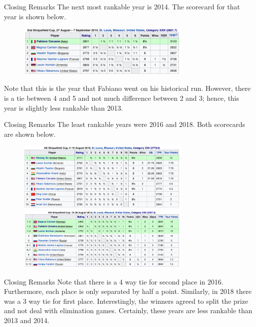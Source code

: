 \documentclass{beamer}
\begin{document}
\begin{frame}{Closing Remarks}
The next most rankable year is 2014.
The scorecard for that year is shown below.
\vfill
\begin{figure}[H]
\centering
\includegraphics[width=0.75\textwidth]{figures/SinquefieldCup2014}
\end{figure}
\vfill
Note that this is the year that Fabiano went on his historical run.
However, there is a tie between 4 and 5 and not much difference between 2 and 3; hence, this year is slightly less rankable than 2013.
\end{frame}

\begin{frame}{Closing Remarks}
The least rankable years were 2016 and 2018. 
Both scorecards are shown below.
\vfill
\begin{figure}[H]
\centering
\includegraphics[width=0.75\textwidth]{figures/SinquefieldCup2016} \\
\includegraphics[width=0.75\textwidth]{figures/SinquefieldCup2018}
\end{figure}
\end{frame}

\begin{frame}{Closing Remarks}
Note that there is a 4 way tie for second place in 2016.
Furthermore, each place is only separated by half a point.
Similarly, in 2018 there was a 3 way tie for first place. 
Interestingly, the winners agreed to split the prize and not deal with elimination games.
Certainly, these years are less rankable than 2013 and 2014. 
\end{frame}
\end{document}
